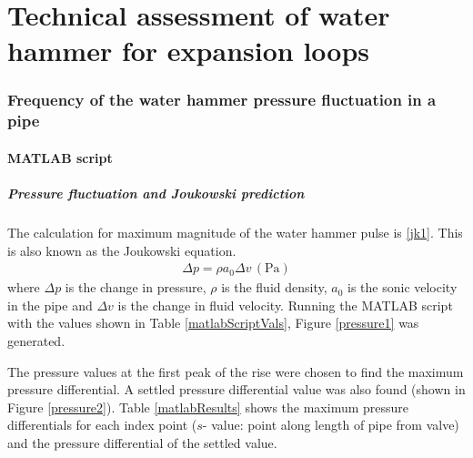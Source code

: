 \part{Technical assessment of water hammer for expansion loops}
\section{Frequency of the water hammer pressure fluctuation in a pipe}
\subsection{MATLAB script}
\subsubsection{Pressure fluctuation and Joukowski prediction}
The calculation for maximum magnitude of the water hammer pulse is \eqref{jk1}. This is also known as the Joukowski equation.
\begin{gather}\label{jk1}
    \Delta p = \rho a_0 \Delta v\, (\si{\pascal})
\end{gather}
where $\Delta p$ is the change in pressure, $\rho$ is the fluid density, $a_0$ is the sonic velocity in the pipe and $\Delta v$ is the change in fluid velocity.
Running the MATLAB script with the values shown in Table \ref{matlabScriptVals}, Figure \ref{pressure1} was generated.

The pressure values at the first peak of the rise were chosen to find the maximum pressure differential. A settled pressure differential value was also found (shown in Figure \ref{pressure2}). Table \ref{matlabResults} shows the maximum pressure differentials for each index point ($s$- value: point along length of pipe from valve) and the pressure differential of the settled value.


